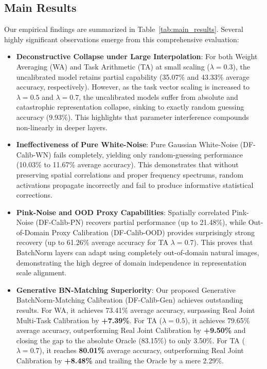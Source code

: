 \documentclass{article}
\theoremstyle{plain}
\theoremstyle{definition}
\theoremstyle{remark}
\begin{document}
\subsection{Main Results}
Our empirical findings are summarized in Table~\ref{tab:main_results}. Several highly significant observations emerge from this comprehensive evaluation:
\begin{itemize}
  \item \textbf{Deconstructive Collapse under Large Interpolation}: For both Weight Averaging (WA) and Task Arithmetic (TA) at small scaling ($\lambda=0.3$), the uncalibrated model retains partial capability (35.07\% and 43.33\% average accuracy, respectively). However, as the task vector scaling is increased to $\lambda=0.5$ and $\lambda=0.7$, the uncalibrated models suffer from absolute and catastrophic representation collapse, sinking to exactly random guessing accuracy (9.93\%). This highlights that parameter interference compounds non-linearly in deeper layers.
  \item \textbf{Ineffectiveness of Pure White-Noise}: Pure Gaussian White-Noise (DF-Calib-WN) fails completely, yielding only random-guessing performance (10.03\% to 11.67\% average accuracy). This demonstrates that without preserving spatial correlations and proper frequency spectrums, random activations propagate incorrectly and fail to produce informative statistical corrections.
  \item \textbf{Pink-Noise and OOD Proxy Capabilities}: Spatially correlated Pink-Noise (DF-Calib-PN) recovers partial performance (up to 21.48\%), while Out-of-Domain Proxy Calibration (DF-Calib-OOD) provides surprisingly strong recovery (up to 61.26\% average accuracy for TA $\lambda=0.7$). This proves that BatchNorm layers can adapt using completely out-of-domain natural images, demonstrating the high degree of domain independence in representation scale alignment.
  \item \textbf{Generative BN-Matching Superiority}: Our proposed Generative BatchNorm-Matching Calibration (DF-Calib-Gen) achieves outstanding results. For WA, it achieves 73.41\% average accuracy, surpassing Real Joint Multi-Task Calibration by \textbf{+7.39\%}. For TA ($\lambda=0.5$), it achieves 79.65\% average accuracy, outperforming Real Joint Calibration by \textbf{+9.50\%} and closing the gap to the absolute Oracle (83.15\%) to only 3.50\%. For TA ($\lambda=0.7$), it reaches \textbf{80.01\%} average accuracy, outperforming Real Joint Calibration by \textbf{+8.48\%} and trailing the Oracle by a mere 2.29\%. 
\end{itemize}
\end{document}
